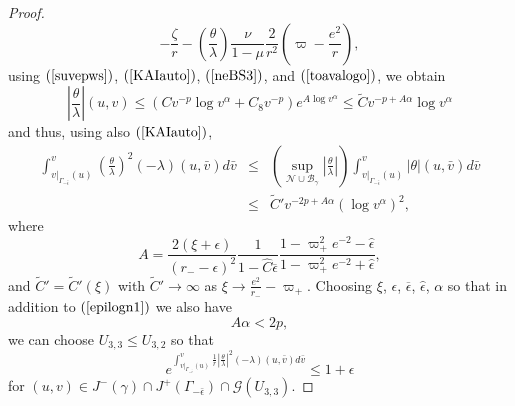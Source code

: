 \documentclass{article}
\newcommand{\tl}{\frac{\theta}{\lambda}}
\begin{document}
{\begin{proof}
\begin{equation}
-\frac\zeta{r}-\left(\frac\theta\lambda\right)\frac\nu{1-\mu}\frac2{r^2}
\left(\varpi-\frac{e^2}r\right),
\end{equation}
using $(\ref{suvepws})$, $(\ref{KAIauto})$, $(\ref{neBS3})$,
and $(\ref{toavalogo})$, we obtain
\[
\left|\frac\theta\lambda\right|(u,v)\le\left(
Cv^{-p}\log v^\alpha+C_8v^{-p}\right)e^{A\log v^\alpha}\le 
\tilde{C}v^{-p+A\alpha}\log v^\alpha
\]
and thus, using also $(\ref{KAIauto})$,
\begin{eqnarray*}
\int_{v|_{\Gamma_{-\bar\epsilon}}(u)}^v
{\left(\frac\theta\lambda\right)^2(-\lambda)(u,\bar{v})d\bar{v}} &\le& 
\left(\sup_{\mathcal{N}\cup \mathcal{B}_\gamma}
\left|\tl\right|\right)
\int_{v|_{\Gamma_{-\bar\epsilon}}(u)}^v
{|\theta|(u,\bar{v})d\bar{v}}\\
&\le&{\tilde C}'
v^{-2p+A\alpha}(\log v^\alpha)^2,
\end{eqnarray*}
where 
\[
A=\frac{2(\xi+\epsilon)}{(r_--\epsilon)^2}
\frac{1}{1-\hat{C}\overline\epsilon}
\frac{1-\varpi_+^2e^{-2}-\hat{\epsilon}}
{1-\varpi_+^2e^{-2}+\hat{\epsilon}},
\]
and $\tilde{C}'=\tilde{C}'(\xi)$
with $\tilde{C}'\to\infty$ as $\xi\to\frac{e^2}{r_-}-\varpi_+$.
Choosing $\xi$, $\epsilon$, $\overline\epsilon$, $\hat{\epsilon}$,
$\alpha$ so that in addition to $(\ref{epilogn1})$ we also
have
\begin{equation}
\label{epilogn2}
A\alpha<2p,
\end{equation}
we can choose $U_{3,3}\le U_{3,2}$ so that
\[
e^{\int_{v|_{\Gamma_{-\bar\epsilon}}(u)}^v
{\frac1r\left|\frac\theta\lambda\right|^2(-\lambda)(u,\bar{v})d\bar{v}}}
\le1+\epsilon
\]
for $(u,v)\in J^{-}(\gamma)\cap J^+(\Gamma_{-\bar\epsilon})\cap\mathcal{G}(U_{3,3})$.


\end{proof}}
\end{document}
